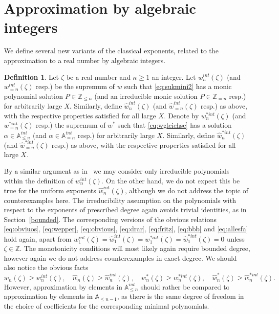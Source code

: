 \documentclass[12pt]{amsart}
\theoremstyle{definition}
\newtheorem{definition}{Definition}
\begin{document}
\section{Approximation by algebraic integers} \label{unifuni}

We define several new variants of the classical exponents, related to the approximation to a real number by algebraic integers.

\begin{definition}  \label{def2}
Let $\zeta$ be a real number and $n\geq 1$ an integer.
Let $w_{n}^{int}(\zeta)$ (and $w_{=n}^{int}(\zeta)$ resp.) be the supremum of $w$ such that
\eqref{eq:sukmini2} has a monic polynomial solution $P\in \mathbb{Z}_{\leq n}$
(and an irreducible monic solution $P\in \mathbb{Z}_{=n}$ resp.) for arbitrarily large $X$.  
Similarly, define $\widehat{w}_{n}^{int}(\zeta)$ (and $\widehat{w}_{=n}^{int}(\zeta)$ resp.) 
as above, with the respective properties satisfied for all large $X$.
Denote by $w_{n}^{\ast int}(\zeta)$ (and $w_{=n}^{\ast int}(\zeta)$ resp.) the supremum of $w^{\ast}$ such that 
\eqref{eq:wgleichse}
has a solution $\alpha\in \mathbb{A}_{\leq n}^{int}$ (and $\alpha\in \mathbb{A}_{=n}^{int}$ resp.) for arbitrarily large $X$.
Similarly, define $\widehat{w}_{n}^{\ast int}(\zeta)$ (and $\widehat{w}_{=n}^{\ast int}(\zeta)$ resp.)
as above, with the respective properties satisfied for 
all large $X$.
\end{definition}

By a similar argument as in~\cite[Hilfssatz~4]{wirsing} we may consider only irreducible polynomials within 
the definition of $w_{n}^{int}(\zeta)$. On the other hand,
we do not expect this be true for the uniform
exponents $\widehat{w}_{n}^{int}(\zeta)$,
although we do not address the topic of counterexamples here.
The irreducibility assumption on the polynomials
with respect to the exponents of prescribed degree again avoids trivial identities, 
as in Section~\ref{bounded}.
The corresponding versions of the obvious relations
\eqref{eq:obviuos}, \eqref{eq:wepper}, \eqref{eq:obvious}, 
\eqref{eq:drar}, \eqref{eq:fritz}, \eqref{eq:bbb} 
and \eqref{eq:allesfa} hold again, 
apart from $w_{1}^{int}(\zeta)=\widehat{w}_{1}^{int}(\zeta)=
w_{1}^{\ast int}(\zeta)=\widehat{w}_{1}^{\ast int}(\zeta)=0$
unless $\zeta\in\mathbb{Z}$. 
The monotonicity conditions
will most likely again require bounded degree,
however again we do not address counterexamples in exact degree.
We should also notice the obvious facts
%
\[
w_{n}(\zeta)\geq w_{n}^{int}(\zeta), \quad \widehat{w}_{n}(\zeta)\geq \widehat{w}_{n}^{int}(\zeta),
\quad w_{n}^{\ast}(\zeta)\geq w_{n}^{\ast int}(\zeta), \quad \widehat{w}_{n}^{\ast}(\zeta)\geq \widehat{w}_{n}^{\ast int}(\zeta).
\]
%
However, approximation by elements in $\mathbb{A}_{\leq n}^{int}$ should rather be compared 
to approximation by elements in $\mathbb{A}_{\leq n-1}$, as there is the same degree of freedom in the choice
of coefficients for the corresponding minimal polynomials.
\end{document}
